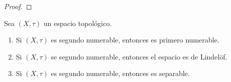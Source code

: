 \documentclass[12pt]{report}
\theoremstyle{largebreak}
\begin{document}
    \begin{proof}
        
    \end{proof}

    \begin{theor}
        Sea $(X,\tau)$ un espacio topológico.
        \begin{enumerate}
            \item Si $(X,\tau)$ es segundo numerable, entonces es primero numerable.
            \item Si $(X,\tau)$ se segundo numerable, entonces el espacio es de Lindelöf.
            \item Si $(X,\tau)$ es segundo numerable, entonces es separable.
        \end{enumerate}
    \end{theor}
     
\end{document}

